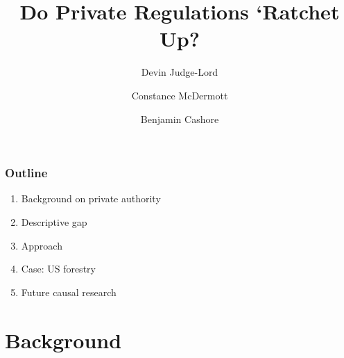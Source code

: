 \documentclass[10pt]{beamer}
\title{Do Private Regulations `Ratchet Up?}
\author{
Devin Judge-Lord\\
\and
Constance McDermott\\
\and
Benjamin Cashore\\
}
\begin{document}
\begin{frame}
\maketitle
\end{frame}


\begin{frame}
\frametitle{Outline}
\begin{enumerate}
\item Background on private authority

\item Descriptive gap

\item Approach

\item Case: US forestry

\item Future causal research
\end{enumerate}





\end{frame}

\section{Background}
\end{document}
